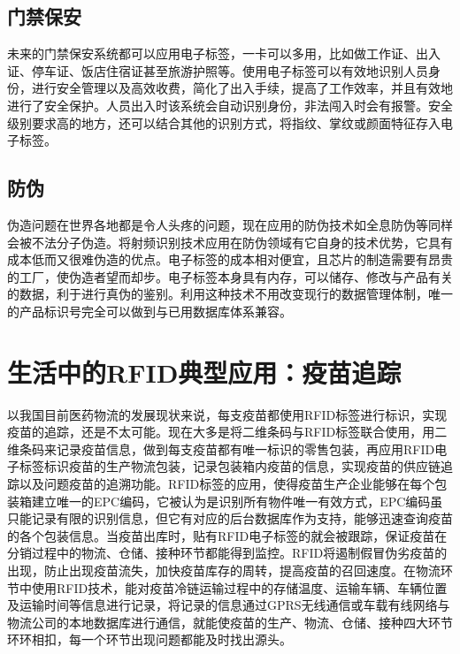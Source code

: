 \documentclass[a4paper]{ctexart}
\begin{document}
\begin{spacing}{1.5}
\subsection{门禁保安}
未来的门禁保安系统都可以应用电子标签，一卡可以多用，比如做工作证、出入证、停车证、饭店住宿证甚至旅游护照等。使用电子标签可以有效地识别人员身份，进行安全管理以及高效收费，简化了出入手续，提高了工作效率，并且有效地进行了安全保护。人员出入时该系统会自动识别身份，非法闯入时会有报警。安全级别要求高的地方，还可以结合其他的识别方式，将指纹、掌纹或颜面特征存入电子标签。

\subsection{防伪}
伪造问题在世界各地都是令人头疼的问题，现在应用的防伪技术如全息防伪等同样会被不法分子伪造。将射频识别技术应用在防伪领域有它自身的技术优势，它具有成本低而又很难伪造的优点。电子标签的成本相对便宜，且芯片的制造需要有昂贵的工厂，使伪造者望而却步。电子标签本身具有内存，可以储存、修改与产品有关的数据，利于进行真伪的鉴别。利用这种技术不用改变现行的数据管理体制，唯一的产品标识号完全可以做到与已用数据库体系兼容。

\section{生活中的RFID典型应用：疫苗追踪}
以我国目前医药物流的发展现状来说，每支疫苗都使用RFID标签进行标识，实现疫苗的追踪，还是不太可能。现在大多是将二维条码与RFID标签联合使用，用二维条码来记录疫苗信息，做到每支疫苗都有唯一标识的零售包装，再应用RFID电子标签标识疫苗的生产物流包装，记录包装箱内疫苗的信息，实现疫苗的供应链追踪以及问题疫苗的追溯功能。RFID标签的应用，使得疫苗生产企业能够在每个包装箱建立唯一的EPC编码，它被认为是识别所有物件唯一有效方式，EPC编码虽只能记录有限的识别信息，但它有对应的后台数据库作为支持，能够迅速查询疫苗的各个包装信息。当疫苗出库时，贴有RFID电子标签的就会被跟踪，保证疫苗在分销过程中的物流、仓储、接种环节都能得到监控。RFID将遏制假冒伪劣疫苗的出现，防止出现疫苗流失，加快疫苗库存的周转，提高疫苗的召回速度。在物流环节中使用RFID技术，能对疫苗冷链运输过程中的存储温度、运输车辆、车辆位置及运输时间等信息进行记录，将记录的信息通过GPRS无线通信或车载有线网络与物流公司的本地数据库进行通信，就能使疫苗的生产、物流、仓储、接种四大环节环环相扣，每一个环节出现问题都能及时找出源头。
\end{spacing}
\end{document}
